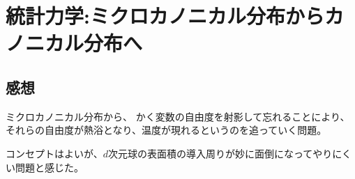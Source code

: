 \documentclass[../ap_2014.tex]{subfiles}
\begin{document}
\setcounter{chapter}{1}
\chapter{統計力学:ミクロカノニカル分布からカノニカル分布へ}



\section*{感想}
ミクロカノニカル分布から、
かく変数の自由度を射影して忘れることにより、
それらの自由度が熱浴となり、温度が現れるというのを追っていく問題。

コンセプトはよいが、\(d\)次元球の表面積の導入周りが妙に面倒になってやりにくい問題と感じた。
\end{document}
